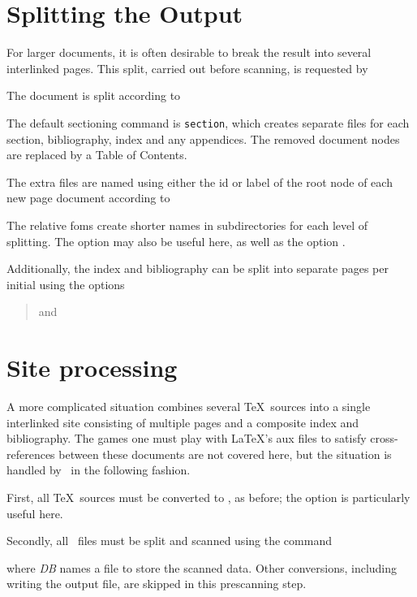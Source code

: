 \documentclass{report}
\begin{document}
\section[Splitting]{Splitting the Output}\label{usage.multiple}
For larger documents, it is often desirable to break the 
result into several interlinked pages. This split,
carried out before scanning, is requested by 
\begin{quote}
\end{quote}
The document is split according to
\begin{quote}
\end{quote}
The default sectioning command is \texttt{section},
which creates separate files for each section,
bibliography, index and any appendices.
The removed document nodes are replaced by a Table of Contents.

The extra files are named using either the id or label
of the root node of each new page document according to
\begin{quote}
\end{quote}
The relative foms create shorter names in subdirectories for each
level of splitting.
The  option may also be useful here,
as well as the  option .

Additionally, the index and bibliography can be split
into separate pages per initial using the options
\begin{quote}
   and 
\end{quote}

\section[Sites]{Site processing}\label{usage.site}
A more complicated situation combines several \TeX\ sources
into a single interlinked site consisting of multiple pages
and a composite index and bibliography.
The games one must play with \LaTeX's aux files to satisfy cross-references
between these documents are not covered here, but the situation is handled
by \LaTeXML\ in the following fashion.

First, all \TeX\ sources must be converted to \XML, as before;
the option  is particularly useful here.

Secondly, all \XML\ files must be split and scanned using
the command
\begin{quote}
\end{quote}
where \textit{DB} names a file to store the scanned data.
Other conversions, including writing the output file, are skipped in this prescanning step.
\end{document}
